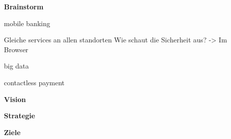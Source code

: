

\textbf{Brainstorm}

mobile banking

Gleiche services an allen standorten
Wie schaut die Sicherheit aus? -> Im Browser



big data




contactless payment




\textbf{Vision}


\textbf{Strategie}


\textbf{Ziele}

